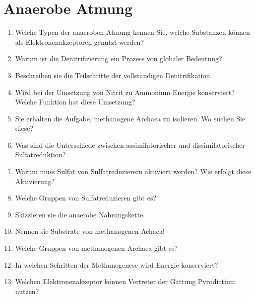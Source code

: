 
\section{Anaerobe Atmung}
\begin{enumerate}
	\item Welche Typen der anaeroben Atmung kennen Sie, welche Substanzen können als Elektronenakzeptoren genutzt werden?
	\item Warum ist die Denitrifizierung ein Prozess von globaler Bedeutung?
	\item Beschreiben sie die Teilschritte der vollständigen Denitrifikation.
	\item Wird bei der Umsetzung von Nitrit zu Ammonium Energie konserviert? Welche Funktion hat diese Umsetzung?
	\item Sie erhalten die Aufgabe, methanogene Archaea zu isolieren. Wo suchen Sie diese?
	\item Was sind die Unterschiede zwischen assimilatorischer und dissimilatorischer Sulfatreduktion?
	\item Warum muss Sulfat von Sulfatreduzierern aktiviert werden? Wie erfolgt diese Aktivierung?
	\item Welche Gruppen von Sulfatreduzieren gibt es?
	\item Skizzieren sie die anaerobe Nahrungskette.
	\item Nennen sie Substrate von methanogenen Achaea!
	\item Welche Gruppen von methanogenen Archaea gibt es?
	\item In welchen Schritten der Methanogenese wird Energie konserviert?
	\item Welchen Elektronenakzeptor können Vertreter der Gattung Pyrodictium nutzen?
\end{enumerate}
